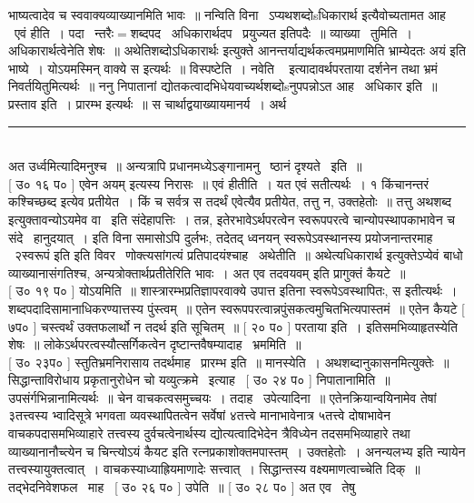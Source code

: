 \documentclass[11pt, openany]{book}
\begin{document}
\begin{multicols}{2}
\noindent
भाष्यत्वादेव च स्ववाक्यव्याख्यानमिति भावः~॥ नन्विति विना \textendash\ ऽप्यथशब्दोsधिकारार्थ इत्यैवोच्यतामत आह \textendash\ एवं हीति~। पदा \textendash\ न्तरैः$=$शब्दपद \textendash\ अधिकारार्थदप \textendash\ प्रयुज्यत इतिपदैः~॥ व्याख्या \textendash\ तुमिति~। अधिकारार्थत्वेनेति शेषः~॥ {\qt अथेतिशब्दोऽधिकारार्थः} इत्युक्ते आनन्तर्याद्यर्थकत्वमप्रमाणमिति भ्राम्येदतः {\qt अयं} इति भाष्ये~। योऽयमस्मिन् वाक्ये स इत्यर्थः~॥ विस्पष्टेति~। {\qt नवेति \textendash\ } इत्यादावर्थपरताया दर्शनेन तथा भ्रमं निवर्तयितुमित्यर्थः~॥ ननु निपातानां द्योतकत्वादभिधेयवाच्यर्थशब्दोsनुपपन्नोऽत आह \textendash\ अधिकार इति~॥ प्रस्ताव इति~। प्रारम्भ इत्यर्थः~॥ स चार्थाद्वयाख्यायमानर्य~। अर्थ \textendash\

\noindent
\rule{1\linewidth}{0.5pt}\\

\noindent
अत उर्ध्वमित्यादिमनुश्च~॥ अन्यत्रापि प्रधानमध्येऽङ्गानामनु \textendash\ ष्ठानं दृश्यते \textendash\ इति~॥\\

 [ उ० १६ प० ] एवेन {\qt अयम्} इत्यस्य निरासः~॥ एवं हीतीति~। यत एवं सतीत्यर्थः~। १ किंचानन्तरं कश्चिच्छब्द इत्येव प्रतीयेत~। किं च सर्वत्र स तदर्थं एवेत्यैव प्रतीयेत, तत्तु न, उक्तहेतोः~॥ तत्तु {\qt अथशब्द इत्युक्तावन्योऽयमेव वा} \textendash\ इति संदेहापत्तिः~। तन्न, इतेरभावेऽर्थपरत्वेन स्वरूपपरत्वे चान्योपस्थापकाभावेन च संदे \textendash\ हानुदयात्~। इति विना समासोऽपि दुर्लभः, तदेतद् ध्वनयन् {\qt स्वरूपेऽवस्थानस्य प्रयोजनान्तरमाह \textendash\ २स्वरूपं इति} इति विवर \textendash\ णोक्त्यसांगत्यं प्रतिपादयंश्चाह \textendash\ अथेतीति~॥ अथेत्यधिकारार्थ इत्युक्तेऽप्येवं बाधो व्याख्यानासंगतिश्च, अन्यत्रोक्तार्थप्रतीतेरिति भावः~। अत एव {\qt तदवयवम्} इति प्रागुक्तं कैयटे~॥ \\

 [ उ० १९ प० ] योऽयमिति~॥ शास्त्रारम्भप्रतिज्ञापरवाक्ये उपात्त इतिना स्वरूपेऽवस्थापितः, स इतीत्यर्थः~। शब्दपदादिसामानाधिकरण्यात्तस्य पुंस्त्वम्~॥ एतेन स्वरूपपरत्वान्नपुंसकत्वमुचितभित्यपास्तमं~॥ एतेन कैयटे [ ७प० ] चस्त्वर्थं उक्तफलार्थो न तदर्थ इति सूचितम्~॥ [ २० प० ] परताया इति~। इतिसमभिव्याहृतस्येति शेषः~॥ लोकेऽर्थपरत्वस्यौत्सर्गिकत्वेन दृष्टान्तवैषम्यादाह \textendash\ भ्रममिति~॥\\

 [ उ० २३प० ] स्तुतिभ्रमनिरासाय तदर्थमाह \textendash\ प्रारम्भ इति~॥ मानस्येति~। अथशब्दानुकासनमित्युक्तेः~॥\\

सिद्धान्ताविरोधाय प्रकृतानुरोधेन चो यव्युत्क्रमे \textendash\ इत्याह \textendash\ [ उ० २४ प० ] निपातानामिति~॥ उपसंर्गभिन्नानामित्यर्थः~॥ चेन वाचकत्वसमुच्चयः~। तदाह \textendash\ उपेत्यादिना~॥ एतेनक्रियान्वयिनामेव तेषां ३तत्त्वस्य भ्वादिसूत्रे भगवता व्यवस्थापितत्वेन सर्वेषां ४तत्त्वे मानाभावेनात्र ५तत्त्वे दोषाभावेन वाचकपदासमभिव्याहारे तत्त्वस्य दुर्वचत्वेनार्थस्य द्योत्यत्वादिभेदेन त्रैविध्येन तदसमभिव्याहारे तथा व्याख्यानानौच्त्येन च चिन्त्योऽयं कैयट इति रत्नप्रकाशोक्तमपास्तम्~। उक्तहेतोः~। अनन्यलभ्य इति न्यायेन तत्त्वस्यायुक्तत्वात्~। वाचकस्याध्याह्रियमाणादेः सत्त्वात्~। सिद्धान्तस्य वक्ष्यमाणत्वाच्चेति दिक्~॥ तद्भेदनिवेशफल \textendash\ माह \textendash\ [ उ० २६ प० ] उपेति~॥ [ उ० २८ प० ] अत एव \textendash\ तेषु


\end{multicols}
\end{document}
